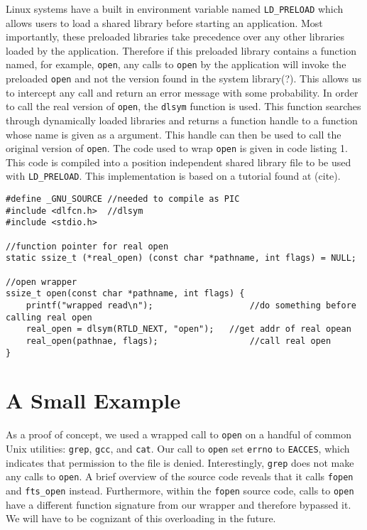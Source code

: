 \documentclass[10pt]{article}
\begin{document}
Linux systems have a built in environment variable named \texttt{LD\_PRELOAD} which allows users to load a shared library before starting an application. Most importantly, these preloaded libraries take precedence over any other libraries loaded by the application. Therefore if this preloaded library contains a function named, for example, \texttt{open}, any calls to \texttt{open} by the application will invoke the preloaded \texttt{open} and not the version found in the system library(?). This allows us to intercept any call and return an error message with some probability. In order to call the real version of \texttt{open}, the \texttt{dlsym} function is used. This function searches through dynamically loaded libraries and returns a function handle to a function whose name is given as a argument. This handle can then be used to call the original version of \texttt{open}. The code used to wrap \texttt{open} is given in code listing 1. This code is compiled into a position independent shared library file to be used with \texttt{LD\_PRELOAD}. This implementation is based on a tutorial found at (cite).
\begin{lstlisting}[caption=\texttt{open} wrapper]
#define _GNU_SOURCE	//needed to compile as PIC
#include <dlfcn.h>	//dlsym
#include <stdio.h>

//function pointer for real open
static ssize_t (*real_open) (const char *pathname, int flags) = NULL;

//open wrapper
ssize_t open(const char *pathname, int flags) {
	printf("wrapped read\n");					//do something before calling real open
	real_open = dlsym(RTLD_NEXT, "open"); 	//get addr of real opean
	real_open(pathnae, flags);					//call real open
}
\end{lstlisting}


\section{A Small Example}
As a proof of concept, we used a wrapped call to \texttt{open} on a handful of common Unix utilities: \texttt{grep}, \texttt{gcc}, and \texttt{cat}. Our call to \texttt{open} set \texttt{errno} to \texttt{EACCES}, which indicates that permission to the file is denied. Interestingly, \texttt{grep} does not make any calls to \texttt{open}. A brief overview of the source code reveals that it calls \texttt{fopen} and \texttt{fts\_open} instead. Furthermore, within the \texttt{fopen} source code, calls to \texttt{open} have a different function signature from our wrapper and therefore bypassed it. We will have to be cognizant of this overloading in the future.
\end{document}
